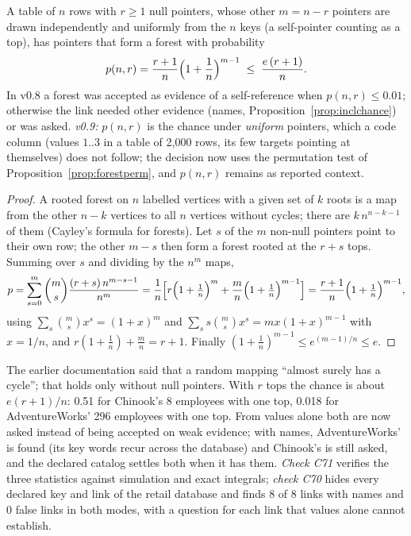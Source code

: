 \begin{proposition}\label{prop:forest}
A table of $n$ rows with $r\ge1$ null pointers, whose other $m=n-r$ pointers are drawn independently and uniformly from the $n$ keys (a self-pointer counting as a top), has pointers that form a forest with probability
\[p(n,r)=\frac{r+1}{n}\Bigl(1+\frac1n\Bigr)^{m-1}\;\le\;\frac{e\,(r+1)}{n}.\]
In v0.8 a forest was accepted as evidence of a self-reference when $p(n,r)\le0.01$; otherwise the link needed other evidence (names, Proposition~\ref{prop:inclchance}) or was asked. \emph{v0.9:} $p(n,r)$ is the chance under \emph{uniform} pointers, which a code column (values $1..3$ in a table of 2{,}000 rows, its few targets pointing at themselves) does not follow; the decision now uses the permutation test of Proposition~\ref{prop:forestperm}, and $p(n,r)$ remains as reported context.
\end{proposition}
\begin{proof}
A rooted forest on $n$ labelled vertices with a given set of $k$ roots is a map from the other $n-k$ vertices to all $n$ vertices without cycles; there are $k\,n^{n-k-1}$ of them (Cayley's formula for forests). Let $s$ of the $m$ non-null pointers point to their own row; the other $m-s$ then form a forest rooted at the $r+s$ tops. Summing over $s$ and dividing by the $n^m$ maps,
\[p=\sum_{s=0}^m\binom ms\frac{(r+s)\,n^{m-s-1}}{n^m}=\frac1n\Bigl[r\Bigl(1+\tfrac1n\Bigr)^m+\frac mn\Bigl(1+\tfrac1n\Bigr)^{m-1}\Bigr]=\frac{r+1}n\Bigl(1+\tfrac1n\Bigr)^{m-1},\]
using $\sum_s\binom ms x^s=(1+x)^m$ and $\sum_s s\binom ms x^s=mx(1+x)^{m-1}$ with $x=1/n$, and $r(1+\frac1n)+\frac mn=r+1$. Finally $(1+\frac1n)^{m-1}\le e^{(m-1)/n}\le e$.
\end{proof}
\noindent The earlier documentation said that a random mapping ``almost surely has a cycle''; that holds only without null pointers. With $r$ tops the chance is about $e(r+1)/n$: 0.51 for Chinook's 8 employees with one top, 0.018 for AdventureWorks' 296 employees with one top. From values alone both are now asked instead of being accepted on weak evidence; with names, AdventureWorks' is found (its key words recur across the database) and Chinook's is still asked, and the declared catalog settles both when it has them. \emph{Check C71} verifies the three statistics against simulation and exact integrals; \emph{check C70} hides every declared key and link of the retail database and finds 8 of 8 links with names and 0 false links in both modes, with a question for each link that values alone cannot establish.

